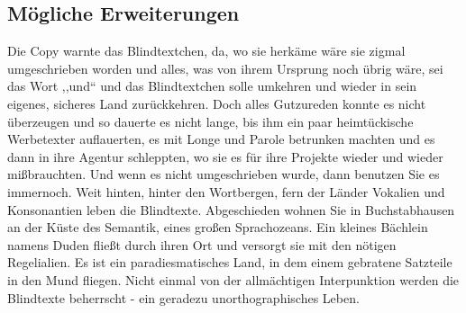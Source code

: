 \documentclass[12pt,a4paper,twoside]{scrartcl}
\numberwithin{equation}{section}
\begin{document}
\subsection{Mögliche Erweiterungen}

Die Copy warnte das Blindtextchen, da, wo sie herkäme wäre sie zigmal umgeschrieben worden und alles, was von ihrem Ursprung noch übrig wäre, sei das Wort ,,und`` und das Blindtextchen solle umkehren und wieder in sein eigenes, sicheres Land zurückkehren. Doch alles Gutzureden konnte es nicht überzeugen und so dauerte es nicht lange, bis ihm ein paar heimtückische Werbetexter auflauerten, es mit Longe und Parole betrunken machten und es dann in ihre Agentur schleppten, wo sie es für ihre Projekte wieder und wieder mißbrauchten. Und wenn es nicht umgeschrieben wurde, dann benutzen Sie es immernoch. Weit hinten, hinter den Wortbergen, fern der Länder Vokalien und Konsonantien leben die Blindtexte. Abgeschieden wohnen Sie in Buchstabhausen an der Küste des Semantik, eines großen Sprachozeans. Ein kleines Bächlein namens Duden fließt durch ihren Ort und versorgt sie mit den nötigen Regelialien. Es ist ein paradiesmatisches Land, in dem einem gebratene Satzteile in den Mund fliegen. Nicht einmal von der allmächtigen Interpunktion werden die Blindtexte beherrscht - ein geradezu unorthographisches Leben.

\clearpage




\end{document}
